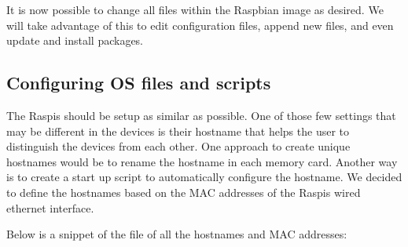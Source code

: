 It is now possible to change all files within the Raspbian image as desired.
We will take advantage of this to edit configuration files, append new files,
and even update and install packages.



\subsection{Configuring OS files and scripts}

The \ac{Raspi}s should be setup as similar as possible. One of those
few settings that may be different in the devices is their hostname that
helps the user to distinguish the devices from each other.
One approach to create unique hostnames would be to rename the hostname
in each memory card. Another way is to create a start up script to automatically
configure the hostname. We decided to define the hostnames based on the \ac{MAC}
addresses of the \ac{Raspi}s wired ethernet interface.

%


Below is a snippet of the file of all the hostnames and \ac{MAC} addresses:

